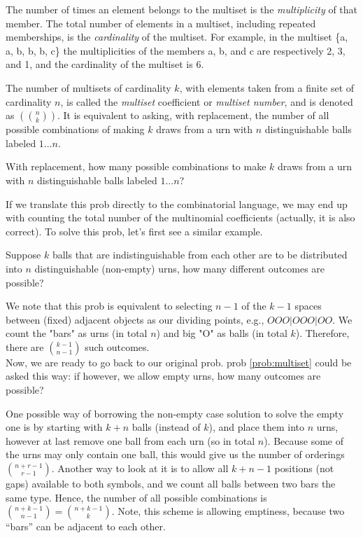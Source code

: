 The number of times an element belongs to the multiset is the {\em{multiplicity}} of that member. The total number of elements in a multiset, including repeated memberships, is the {\em{cardinality}} of the multiset. For example, in the multiset \{a, a, b, b, b, c\} the multiplicities of the members a, b, and c are respectively 2, 3, and 1, and the cardinality of the multiset is 6.

The number of multisets of cardinality $k$, with elements taken from a finite set of cardinality $n$, is called the {\em{multiset}} coefficient or {\em{multiset number}}, and is denoted as $\left(\!\!{n\choose k}\!\!\right)$. It is equivalent to asking, with replacement, the number of all possible combinations of making $k$ draws from a urn with $n$ distinguishable balls labeled $1 \dots n$.

\begin{prob}\label{prob:multiset}
	With replacement, how many possible combinations to make $k$ draws from a urn with $n$ distinguishable balls labeled $1 \dots n$?
\end{prob}
If we translate this prob directly to the combinatorial language,  we may end up with counting the total number of the multinomial coefficients (actually, it is also correct). To solve this prob, let's first see a similar example.

\begin{prob}
	Suppose $k$ balls that are indistinguishable from each other are to be distributed into $n$ distinguishable (non-empty) urns, how many different outcomes are possible?
\end{prob}
We note that this prob is equivalent to selecting $n-1$ of the $k-1$ spaces between (fixed) adjacent objects as our dividing points,  e.g., $OOO|OOO|OO$. We count the "bars" as urns (in total $n$) and big "O" as balls (in total $k$). Therefore, there are $k-1 \choose n-1$ such outcomes.\\


Now, we are ready to go back to our original prob. prob \ref{prob:multiset} could be asked this way: if however, we allow empty urns, how many outcomes are possible?

One possible way of borrowing the non-empty case solution to solve the empty one is by starting with $k+n$ balls (instead of $k$), and place them into $n$ urns,  however at last remove one ball from each urn (so in total $n$). Because some of the urns may only contain one ball, this would give us the number of orderings $n+r-1 \choose r-1$. Another way to look at it is to allow all $k+n-1$ positions (not gaps) available to both symbols, and we count all balls between two bars the same type. Hence, the number of all possible combinations is ${n+k-1 \choose n-1} = {n+k-1 \choose k}$. Note, this scheme is allowing emptiness, because two ``bars'' can be adjacent to each other.

